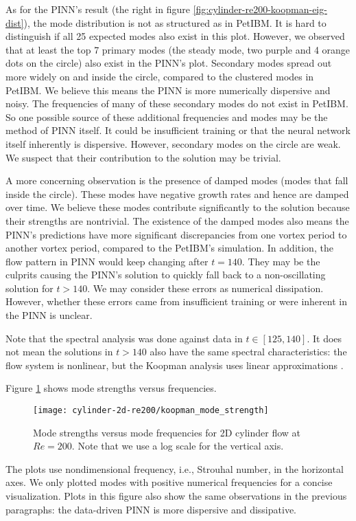 As for the PINN's result (the right in figure \ref{fig:cylinder-re200-koopman-eig-dist}), the mode distribution is not as structured as in PetIBM.
It is hard to distinguish if all 25 expected modes also exist in this plot.
However, we observed that at least the top 7 primary modes (the steady mode, two purple and 4 orange dots on the circle) also exist in the PINN's plot.
Secondary modes spread out more widely on and inside the circle, compared to the clustered modes in PetIBM.
We believe this means the PINN is more numerically dispersive and noisy.
The frequencies of many of these secondary modes do not exist in PetIBM.
So one possible source of these additional frequencies and modes may be the method of PINN itself.
It could be insufficient training or that the neural network itself inherently is dispersive. 
However, secondary modes on the circle are weak.
We suspect that their contribution to the solution may be trivial.

A more concerning observation is the presence of damped modes (modes that fall inside the circle). 
These modes have negative growth rates and hence are damped over time.
We believe these modes contribute significantly to the solution because their strengths are nontrivial.
The existence of the damped modes also means the PINN's predictions have more significant discrepancies from one vortex period to another vortex period, compared to the PetIBM's simulation.
In addition, the flow pattern in PINN would keep changing after $t=140$.
They may be the culprits causing the PINN's solution to quickly fall back to a non-oscillating solution for $t>140$.
We may consider these errors as numerical dissipation.
However, whether these errors came from insufficient training or were inherent in the PINN is unclear.

Note that the spectral analysis was done against data in $t\in[125, 140]$.
It does not mean the solutions in $t>140$ also have the same spectral characteristics: the flow system is nonlinear, but the Koopman analysis uses linear approximations \cite{rowley_spectral_2009}.

Figure \ref{fig:cylinder-re200-koopman-mode-strength} shows mode strengths versus frequencies.
\begin{figure}
    \centering%
    \texttt{[image: cylinder-2d-re200/koopman\_mode\_strength]}%
    \caption{%
        Mode strengths versus mode frequencies for 2D cylinder flow at $Re=\num{200}$.
        Note that we use a log scale for the vertical axis.
    }
    \label{fig:cylinder-re200-koopman-mode-strength}%
\end{figure}
The plots use nondimensional frequency, i.e., Strouhal number, in the horizontal axes. 
We only plotted modes with positive numerical frequencies for a concise visualization.
Plots in this figure also show the same observations in the previous paragraphs: the data-driven PINN is more dispersive and dissipative.

